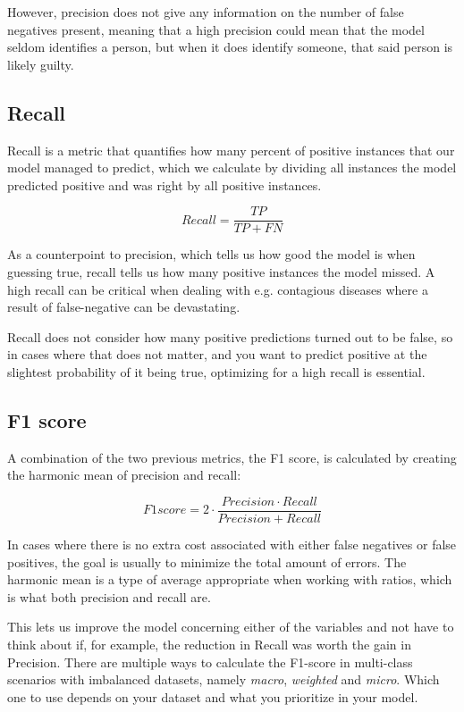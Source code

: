 \documentclass[nofilelist]{cslthse-msc}
\begin{document}
However, precision does not give any information on the number of false negatives present, meaning that a high precision could mean that the model seldom identifies a person, but when it does identify someone, that said person is likely guilty.

\subsection{Recall}
Recall is a metric that quantifies how many percent of positive instances that our model managed to predict, which we calculate by dividing all instances the model predicted positive and was right by all positive instances.

$$ Recall =\frac{TP}{TP + FN}$$

As a counterpoint to precision, which tells us how good the model is when guessing true, recall tells us how many positive instances the model missed. A high recall can be critical when dealing with e.g. contagious diseases where a result of false-negative can be devastating. 

Recall does not consider how many positive predictions turned out to be false, so in cases where that does not matter, and you want to predict positive at the slightest probability of it being true, optimizing for a high recall is essential.


\subsection{F1 score}
A combination of the two previous metrics, the F1 score, is calculated by creating the harmonic mean of precision and recall:

$$ F1score = 2 \cdot \frac{Precision \cdot Recall}{Precision + Recall}$$

In cases where there is no extra cost associated with either false negatives or false positives, the goal is usually to minimize the total amount of errors. The harmonic mean is a type of average appropriate when working with ratios, which is what both precision and recall are. 

This lets us improve the model concerning either of the variables and not have to think about if, for example, the reduction in Recall was worth the gain in Precision. There are multiple ways to calculate the F1-score in multi-class scenarios with imbalanced datasets, namely \textit{macro}, \textit{weighted} and \textit{micro}. Which one to use depends on your dataset and what you prioritize in your model. 
\end{document}
